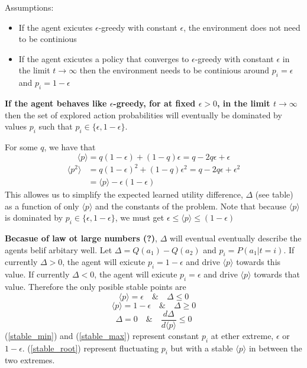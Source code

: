 \documentclass[a4paper]{article}
\newcommand{\ep}{\langle p \rangle}
\newcommand{\pp}{\langle p^2 \rangle}
\begin{document}
Assumptions:
\begin{itemize}
	\item If the agent exicutes $\epsilon$-greedy with constant $\epsilon$, the environment does not need to be continious
	\item If the agent exicutes a policy that converges to $\epsilon$-greedy with constant $\epsilon$ in the limit $t\rightarrow\infty$ then the environment needs to be continious around $p_i=\epsilon$ and $p_i=1-\epsilon$
\end{itemize}


\textbf{If the agent behaves like $\epsilon$-greedy, for at fixed $\epsilon>0$, in the limit $t\rightarrow\infty$} then the set of explored action probabilities will eventually be dominated by values $p_i$ such that $p_i\in\{\epsilon,1-\epsilon\}$.

For some $q$, we have that
\begin{equation}
	\ep = q(1-\epsilon) + (1-q)\epsilon = q - 2q\epsilon + \epsilon
\end{equation}
\begin{align}
	\pp &= q(1-\epsilon)^2 + (1-q)\epsilon^2 = q - 2q\epsilon + \epsilon^2\\
	    &= \ep - \epsilon(1-\epsilon)
\end{align}
This allowes us to simplify the expected learned utility difference, $\Delta$ (see table) as a function of only $\ep$ and the constants of the problem. Note that because $\ep$ is dominated by $p_i\in\{\epsilon,1-\epsilon\}$, we must get $\epsilon\leq\ep\leq(1-\epsilon)$

\textbf{Becasue of law ot large numbers (?)}, $\Delta$ will eventual eventually describe the agents belif arbitary well. Let $\Delta=Q(a_1)-Q(a_2)$ and $p_i = P(a_1|t=i)$. If currently $\Delta>0$, the agent will exicute $p_i=1-\epsilon$ and drive $\ep$ towards this value. If currently $\Delta<0$, the agent will exicute $p_i=\epsilon$ and drive $\ep$ towards that value. Therefore the only posible stable points are
\begin{equation}\label{stable_min}
	\ep = \epsilon \quad \& \quad \Delta\leq0
\end{equation}
\begin{equation}\label{stable_max}
	\ep = 1-\epsilon \quad \& \quad \Delta\geq0
\end{equation}
\begin{equation}\label{stable_root}
	\Delta=0 \quad \& \quad \frac{d\Delta}{d\ep}\leq0
\end{equation}
(\ref{stable_min}) and (\ref{stable_max}) represent constant $p_i$ at ether extreme, $\epsilon$ or $1-\epsilon$. (\ref{stable_root}) represent fluctuating $p_i$ but with a stable $\ep$ in between the two extremes.
\end{document}
